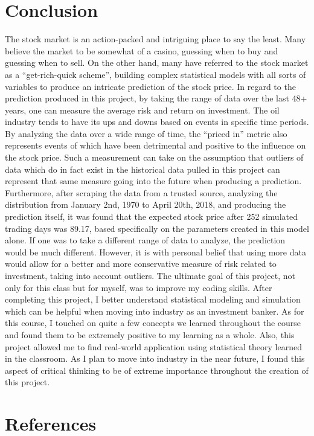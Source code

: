 \documentclass{article}
\begin{document}
\section{Conclusion}
The stock market is an action-packed and intriguing place to say the least. Many believe the market to be somewhat of a casino, guessing when to buy and guessing when to sell. On the other hand, many have referred to the stock market as a “get-rich-quick scheme”, building complex statistical models with all sorts of variables to produce an intricate prediction of the stock price. In regard to the prediction produced in this project, by taking the range of data over the last 48+ years, one can measure the average risk and return on investment. The oil industry tends to have its ups and downs based on events in specific time periods. By analyzing the data over a wide range of time, the “priced in” metric also represents events of which have been detrimental and positive to the influence on the stock price. Such a measurement can take on the assumption that outliers of data which do in fact exist in the historical data pulled in this project can represent that same measure going into the future when producing a prediction.
\\
Furthermore, after scraping the data from a trusted source, analyzing the distribution from January 2nd, 1970 to April 20th, 2018, and producing the prediction itself, it was found that the expected stock price after 252 simulated trading days was 89.17, based specifically on the parameters created in this model alone. If one was to take a different range of data to analyze, the prediction would be much different. However, it is with personal belief that using more data would allow for a better and more conservative measure of risk related to investment, taking into account outliers. The ultimate goal of this project, not only for this class but for myself, was to improve my coding skills. After completing this project, I better understand statistical modeling and simulation which can be helpful when moving into industry as an investment banker. As for this course, I touched on quite a few concepts we learned throughout the course and found them to be extremely positive to my learning as a whole. Also, this project allowed me to find real-world application using statistical theory learned in the classroom. As I plan to move into industry in the near future, I found this aspect of critical thinking to be of extreme importance throughout the creation of this project.

\newpage
\section{References}
\end{document}
